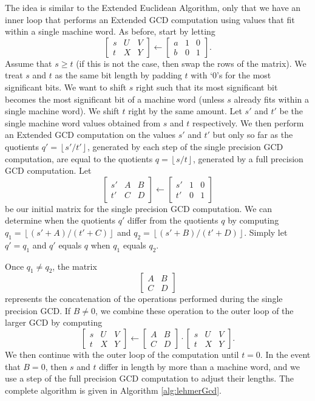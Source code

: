 \documentclass{ucalgthes1}
\theoremstyle{plain}
\theoremstyle{definition}
\newcommand{\matrixtt}[4]{\left[ \begin{array}{rr} #1 & #2 \\ #3 & #4 \end{array} \right]}
\newcommand{\matrixThreeTwo}[6]{\left[ \begin{array}{rrr} #1 & #2 & #3 \\ #4 & #5 & #6 \end{array} \right]}
\newcommand{\floor}[1]{\left\lfloor #1 \right\rfloor}
\begin{document}
The idea is similar to the Extended Euclidean Algorithm, only that we have an inner loop that performs an Extended GCD computation using values that fit within a single machine word.  As before, start by letting
\[
	\matrixThreeTwo{s}{U}{V}{t}{X}{Y} \gets \matrixThreeTwo{a}{1}{0}{b}{0}{1}.
\]
Assume that $s \ge t$ (if this is not the case, then swap the rows of the matrix).  We treat $s$ and $t$ as the same bit length by padding $t$ with `0's for the most significant bits.  We want to shift $s$ right such that its most significant bit becomes the most significant bit of a machine word (unless $s$ already fits within a single machine word).  We shift $t$ right by the same amount. Let $s'$ and $t'$ be the single machine word values obtained from $s$ and $t$ respectively.  We then perform an Extended GCD computation on the values $s'$ and $t'$ but only so far as the quotients $q'=\floor{s'/t'}$, generated by each step of the single precision GCD computation, are equal to the quotients $q=\floor{s/t}$, generated by a full precision GCD computation.  Let
\[
\matrixThreeTwo{s'}{A}{B}{t'}{C}{D} \gets \matrixThreeTwo{s'}{1}{0}{t'}{0}{1}
\]
be our initial matrix for the single precision GCD computation.  We can determine when the quotients $q'$ differ from the quotients $q$ by computing $q_1 = \floor{(s'+A)/(t'+C)}$ and $q_2 = \floor{(s'+B)/(t'+D)}$.  Simply let $q' = q_1$ and $q'$ equals $q$ when $q_1$ equals $q_2$.

Once $q_1 \neq q_2$, the matrix
\[
\matrixtt{A}{B}{C}{D}
\]
represents the concatenation of the operations performed during the single precision GCD.  If $B \neq 0$, we combine these operation to the outer loop of the larger GCD by computing
\[
\matrixThreeTwo{s}{U}{V}{t}{X}{Y} \gets \matrixtt{A}{B}{C}{D}
		        \cdot \matrixThreeTwo{s}{U}{V}{t}{X}{Y}.
\]
We then continue with the outer loop of the computation until $t = 0$.  In the event that $B=0$, then $s$ and $t$ differ in length by more than a machine word, and we use a step of the full precision GCD computation to adjust their lengths.  The complete algorithm is given in Algorithm \ref{alg:lehmerGcd}.
\end{document}
